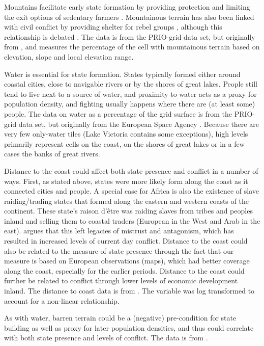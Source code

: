 \documentclass[12pt]{article}
\begin{document}
Mountains facilitate early state formation by providing protection and limiting the
exit options of sedentary farmers \citep{Carneiro1988}. Mountainous terrain has
also been linked with civil conflict by providing shelter for rebel groups
\citep{Hegre2006}, although this relationship is debated \citep{Buhaug2002}. The
data is from the PRIO-grid data set, but originally from \citet{Blyth2002}, and
measures the percentage of the cell with mountainous terrain based on elevation,
slope and local elevation range.

Water is essential for state formation. States typically formed either around
coastal cities, close to navigable rivers or by the shores of great lakes.
People still tend to live next to a source of water, and proximity to water acts
as a proxy for population density, and fighting usually happens where there are
(at least some) people. The data on water as a percentage of the grid surface is
from the PRIO-grid data set, but originally from the European Space Agency
\citep{Bontemps2009}. Because there are very few only-water tiles (Lake Victoria
contains some exceptions), high levels primarily represent cells on the coast,
on the shores of great lakes or in a few cases the banks of great rivers.

Distance to the coast could affect both state presence and conflict in a number
of ways. First, as stated above, states were more likely form along the coast as
it connected cities and people. A special case for Africa is also the existence
of slave raiding/trading states that formed along the eastern and western coasts
of the continent. These state's raison d'être was raiding slaves from tribes and
peoples inland and selling them to coastal traders (European in the West and
Arab in the east). \citet{Nunn2008} argues that this left legacies of mistrust
and antagonism, which has resulted in increased levels of current day conflict.
Distance to the coast could also be related to the measure of state presence
through the fact that our measure is based on European observations (maps),
which had better coverage along the coast, especially for the earlier periods.
Distance to the coast could further be related to conflict through lower levels
of economic development inland. The distance to coast data is from
\citet{Wessel1996}. The variable was log transformed to account for a non-linear
relationship.

As with water, barren terrain could be a (negative) pre-condition for state
building as well as proxy for later population densities, and thus could
correlate with both state presence and levels of conflict. The data is from
\citet{Bontemps2009}.
\end{document}
